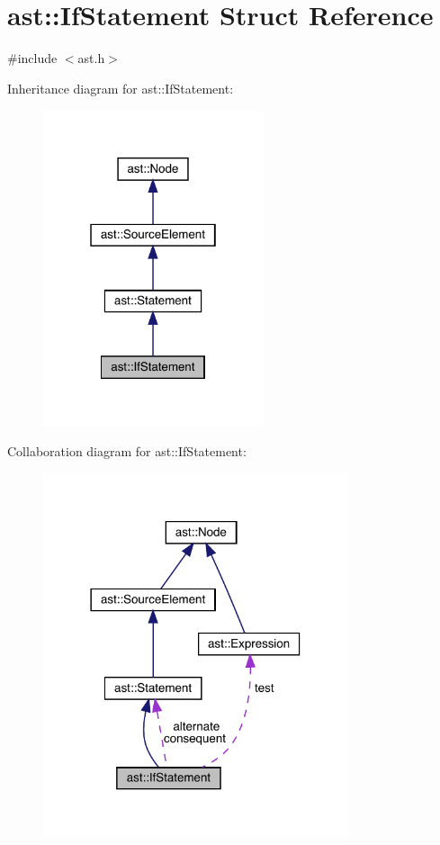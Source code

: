 \hypertarget{structast_1_1_if_statement}{}\section{ast\+:\+:If\+Statement Struct Reference}
\label{structast_1_1_if_statement}


{\ttfamily \#include $<$ast.\+h$>$}



Inheritance diagram for ast\+:\+:If\+Statement\+:\nopagebreak
\begin{figure}[H]
\begin{center}
\leavevmode
\includegraphics[width=183pt]{structast_1_1_if_statement__inherit__graph}
\end{center}
\end{figure}


Collaboration diagram for ast\+:\+:If\+Statement\+:\nopagebreak
\begin{figure}[H]
\begin{center}
\leavevmode
\includegraphics[width=254pt]{structast_1_1_if_statement__coll__graph}
\end{center}
\end{figure}
